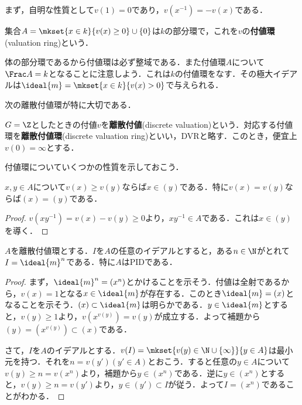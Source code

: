 まず，自明な性質として$v(1)=0$であり，$v(x^{-1})=-v(x)$である．

\begin{defi}
	集合$A=\mkset{x\in k}{v(x)\geq0}\cup\{0\}$は$k$の部分環で，これを$v$の\textbf{付値環}(valuation ring)という．
\end{defi}

体の部分環であるから付値環は必ず整域である．また付値環$A$について$\Frac A=k$となることに注意しよう．これは$k$の付値環をなす．その極大イデアルは$\ideal{m}=\mkset{x\in k}{v(x)>0}$で与えられる．

次の離散付値環が特に大切である．
\begin{defi}[離散付値]
	$G=\Z$としたときの付値$v$を\textbf{離散付値}(discrete valuation)という．対応する付値環を\textbf{離散付値環}(discrete valuation ring)といい，DVRと略す．このとき，便宜上$v(0)=\infty$とする．
\end{defi}

付値環についていくつかの性質を示しておこう．

\begin{lem}
	$x,y\in A$について$v(x)\geq v(y)$ならば$x\in (y)$である．特に$v(x)=v(y)$ならば$(x)=(y)$である．
\end{lem}

\begin{proof}
	$v(xy^{-1})=v(x)-v(y)\geq0$より，$xy^{-1}\in A$である．これは$x\in (y)$を導く．
\end{proof}

\begin{prop}\label{prop:離散付値環の性質}
	$A$を離散付値環とする．$I$を$A$の任意のイデアルとすると，ある$n\in\N$がとれて$I=\ideal{m}^n$である．特に$A$はPIDである．
\end{prop}

\begin{proof}
	まず，$\ideal{m}^n=(x^n)$とかけることを示そう．付値は全射であるから，$v(x)=1$となる$x\in\ideal{m}$が存在する．このとき$\ideal{m}=(x)$となることを示そう．$(x)\subset\ideal{m}$は明らかである．$y\in\ideal{m}$とすると，$v(y)\geq1$より，$v(x^{v(y)})=v(y)$が成立する．よって補題から$(y)=(x^{v(y)})\subset(x)$である．
	
	さて，$I$を$A$のイデアルとする．$v(I)=\mkset{v(y)\in\N\cup\{\infty\}}{y\in A}$は最小元を持つ．それを$n=v(y') (y'\in A)$とおこう．すると任意の$y\in A$について$v(y)\geq n=v(x^n)$より，補題から$y\in (x^n)$である．逆に$y\in(x^n)$とすると，$v(y)\geq n=v(y')$より，$y\in(y')\subset I$が従う．よって$I=(x^n)$であることがわかる．
\end{proof}

